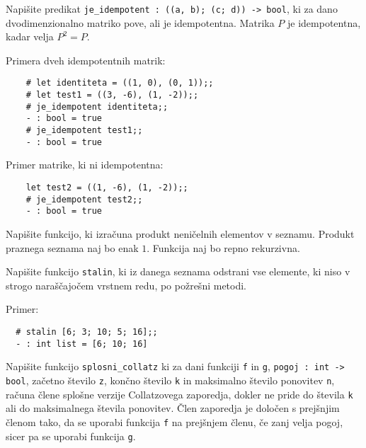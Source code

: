 \documentclass[arhiv]{../izpit}
\begin{document}
	


\naloga

\podnaloga
Napišite predikat \verb|je_idempotent : ((a, b); (c; d)) -> bool|,
   ki za dano dvodimenzionalno matriko pove, ali je idempotentna.
   Matrika $P$ je idempotentna, kadar velja $P^2 = P$.

  
  Primera dveh idempotentnih matrik:
  \begin{verbatim}
    # let identiteta = ((1, 0), (0, 1));;
    # let test1 = ((3, -6), (1, -2));;
    # je_idempotent identiteta;;
    - : bool = true
    # je_idempotent test1;;
    - : bool = true
  \end{verbatim}

  Primer matrike, ki ni idempotentna:
  \begin{verbatim}
    let test2 = ((1, -6), (1, -2));;
    # je_idempotent test2;;
    - : bool = true
  \end{verbatim}
  
\podnaloga
Napišite funkcijo, ki izračuna produkt neničelnih elementov v seznamu.
Produkt praznega seznama naj bo enak $1$. Funkcija naj bo repno rekurzivna.
  

\podnaloga
Napišite funkcijo \verb|stalin|, ki iz danega seznama odstrani vse elemente, 
ki niso v strogo naraščajočem vrstnem redu, po požrešni metodi.

Primer:
\begin{verbatim}
  # stalin [6; 3; 10; 5; 16];;
  - : int list = [6; 10; 16]
\end{verbatim}


  \podnaloga
  Napišite funkcijo \verb|splosni_collatz| ki za dani funkciji \verb|f| in \verb|g|, \verb|pogoj : int -> bool|, 
  začetno število \verb|z|, končno število \verb|k| in maksimalno število ponovitev \verb|n|, 
  računa člene splošne verzije Collatzovega zaporedja, dokler ne pride do števila \verb|k| 
  ali do maksimalnega števila ponovitev.
  Člen zaporedja je določen s prejšnjim členom tako, da se uporabi funkcija \verb|f| na prejšnjem členu,
  če zanj velja pogoj, sicer pa se uporabi funkcija \verb|g|.  
\end{document}
